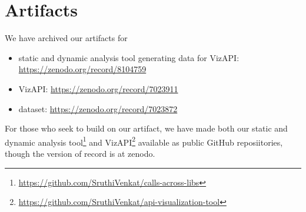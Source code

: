 \section{Artifacts}
\label{sec:artifacts}
We have archived our artifacts for
\begin{itemize}
\item static and dynamic analysis tool generating data for VizAPI: \url{https://zenodo.org/record/8104759}
\item VizAPI: \url{https://zenodo.org/record/7023911}
\item dataset: \url{https://zenodo.org/record/7023872}
\end{itemize}
For those who seek to build on our artifact, we have made both
our static and dynamic analysis tool\footnote{\url{https://github.com/SruthiVenkat/calls-across-libs}}
and VizAPI\footnote{\url{https://github.com/SruthiVenkat/api-visualization-tool}}
available as public GitHub reposiitories, though the version of record is at zenodo.
